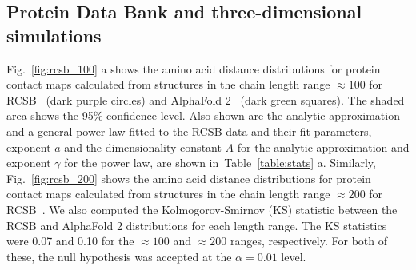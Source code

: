 \documentclass[notitlepage,
reprint,%
onecolumn,
amsmath,amssymb,superscriptaddress,aps,
pre,floatfix]{revtex4-1}
\begin{document}
\begin{figure}[htb]
\end{figure}

\subsection{Protein Data Bank and three-dimensional simulations}

Fig.~\ref{fig:rcsb_100} a shows the amino acid distance distributions for protein contact maps calculated from structures in the chain length range $\approx100$ for RCSB~\cite{PDB} (dark purple circles) and AlphaFold 2~\cite{jumper2021highly} (dark green squares). The shaded area shows the 95\% confidence level. Also shown are the analytic approximation and a general power law fitted to the RCSB data and their fit parameters, exponent $a$ and the dimensionality constant $A$ for the analytic approximation and exponent $\gamma$ for the power law,  are shown in~Table~\ref{table:stats} a. Similarly, Fig.~\ref{fig:rcsb_200} shows the amino acid distance distributions for protein contact maps calculated from structures in the chain length range $\approx200$ for RCSB~\cite{PDB}. We also computed the Kolmogorov-Smirnov (KS) statistic between the RCSB and AlphaFold 2 distributions for each length range. The KS statistics were 0.07 and 0.10 for the $\approx100$ and $\approx200$ ranges, respectively. For both of these, the null hypothesis was accepted at the $\alpha=0.01$ level.
\end{document}
